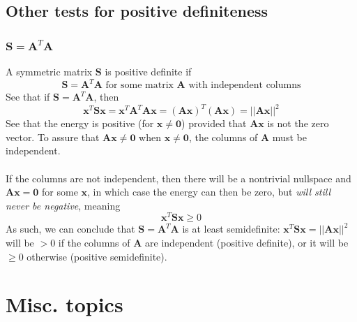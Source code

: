 \documentclass{report}
\begin{document}
\section{Other tests for positive definiteness}
\subsection{$\bm S=\bm A^T\bm A$}
A symmetric matrix $\bm S$ is positive definite if
\begin{equation*}
\bm S=\bm A^T\bm A\text{ for some matrix $\bm A$ with independent columns}
\end{equation*}
See that if $\bm S=\bm A^T\bm A$, then
\begin{equation*}
\bm x^T\bm{Sx}=\bm x^T\bm A^T\bm A\bm x=(\bm A\bm x)^T(\bm A\bm x)
=||\bm{Ax}||^2
\end{equation*}
See that the energy is positive (for $\bm x\neq\bm 0$) provided that $\bm{Ax}$ is not the zero vector. To assure that $\bm{Ax}\neq\bm0$ when 
$\bm x\neq\bm0$, the columns of $\bm A$ must be independent.\\
\vspace{1mm}\\
If the columns are not independent, then there will be a nontrivial nullspace and $\bm{Ax}=\bm0$ for some $\bm x$, in which case the energy 
can then be zero, but \textit{will still never be negative}, meaning
\begin{equation*}
\bm x^T\bm{Sx}\geq0
\end{equation*}
As such, we can conclude that $\bm S=\bm A^T\bm A$ is at least semidefinite: $\bm x^T\bm{Sx}=||\bm{Ax}||^2$ will be $>0$ if the columns
of $\bm A$ are independent (positive definite), or it will be $\geq0$ otherwise (positive semidefinite).
\newpage

\subsection{}






\appendix
\chapter{Misc. topics}
\end{document}
